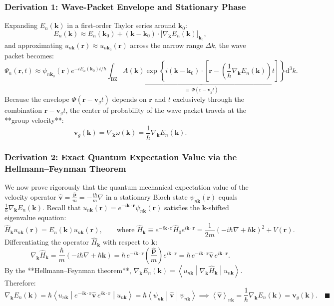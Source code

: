 \documentclass[11pt,a4paper]{article}
\newcommand{\mel}[3]{\left\langle #1 \middle| #2 \middle| #3 \right\rangle}
\newcommand{\expect}[1]{\left\langle #1 \right\rangle}
\newcommand{\vb}[1]{\mathbf{#1}}
\newcommand{\hb}{\hbar}
\newcommand{\dd}{\mathrm{d}}
\newcommand{\kk}{\mathbf{k}}
\newcommand{\rvec}{\mathbf{r}}
\newcommand{\BZ}{\text{BZ}}
\begin{document}
\subsubsection{Derivation 1: Wave-Packet Envelope and Stationary Phase}
Expanding $E_n(\kk)$ in a first-order Taylor series around $\kk_0$:
\begin{equation}
    E_n(\kk) \approx E_n(\kk_0) + (\kk - \kk_0)\cdot\big[\nabla_{\kk}E_n(\kk)\big]_{\kk_0},
\end{equation}
and approximating $u_{n\kk}(\rvec) \approx u_{n\kk_0}(\rvec)$ across the narrow range $\Delta k$, the wave packet becomes:
\begin{equation}
    \Psi_n(\rvec, t) \approx \psi_{n\kk_0}(\rvec) e^{-iE_n(\kk_0)t/\hb} \underbrace{\int_{\BZ} A(\kk)\exp\left\{i(\kk-\kk_0)\cdot\left[\rvec - \left(\frac{1}{\hb}\nabla_{\kk}E_n(\kk)\right)t\right]\right\}\dd^3 k}_{\equiv\, \Phi(\rvec - \vb{v}_g t)}.
\end{equation}
Because the envelope $\Phi(\rvec - \vb{v}_g t)$ depends on $\rvec$ and $t$ exclusively through the combination $\rvec - \vb{v}_g t$, the center of probability of the wave packet travels at the **group velocity**:
\begin{equation}
    \boxed{\vb{v}_g(\kk) = \nabla_{\kk}\omega(\kk) = \frac{1}{\hb}\nabla_{\kk}E_n(\kk).}
    \label{eq:vg_master}
\end{equation}

\subsubsection{Derivation 2: Exact Quantum Expectation Value via the Hellmann--Feynman Theorem}
We now prove rigorously that the quantum mechanical expectation value of the velocity operator $\hat{\vb{v}} = \frac{\hat{\vb{p}}}{m} = -\frac{i\hb}{m}\nabla$ in a stationary Bloch state $\psi_{n\kk}(\rvec)$ equals $\frac{1}{\hb}\nabla_{\kk}E_n(\kk)$.
Recall that $u_{n\kk}(\rvec) = e^{-i\kk\cdot\rvec}\psi_{n\kk}(\rvec)$ satisfies the $\kk$-shifted eigenvalue equation:
\begin{equation}
    \hat{H}_{\kk} u_{n\kk}(\rvec) = E_n(\kk) u_{n\kk}(\rvec), \qquad \text{where } \hat{H}_{\kk} \equiv e^{-i\kk\cdot\rvec}\hat{H}_0 e^{i\kk\cdot\rvec} = \frac{1}{2m}(-i\hb\nabla + \hb\kk)^2 + V(\rvec).
\end{equation}
Differentiating the operator $\hat{H}_{\kk}$ with respect to $\kk$:
\begin{equation}
    \nabla_{\kk}\hat{H}_{\kk} = \frac{\hb}{m}(-i\hb\nabla + \hb\kk) = \hb\,e^{-i\kk\cdot\rvec}\left(\frac{\hat{\vb{p}}}{m}\right)e^{i\kk\cdot\rvec} = \hb\,e^{-i\kk\cdot\rvec}\hat{\vb{v}}\,e^{i\kk\cdot\rvec}.
\end{equation}
By the **Hellmann--Feynman theorem**, $\nabla_{\kk}E_n(\kk) = \mel{u_{n\kk}}{\nabla_{\kk}\hat{H}_{\kk}}{u_{n\kk}}$. Therefore:
\begin{equation}
    \nabla_{\kk}E_n(\kk) = \hb\mel{u_{n\kk}}{e^{-i\kk\cdot\rvec}\hat{\vb{v}}\,e^{i\kk\cdot\rvec}}{u_{n\kk}} = \hb\mel{\psi_{n\kk}}{\hat{\vb{v}}}{\psi_{n\kk}} \implies \boxed{\expect{\hat{\vb{v}}}_{n\kk} = \frac{1}{\hb}\nabla_{\kk}E_n(\kk) = \vb{v}_g(\kk).} \quad \blacksquare
\end{equation}
\end{document}

